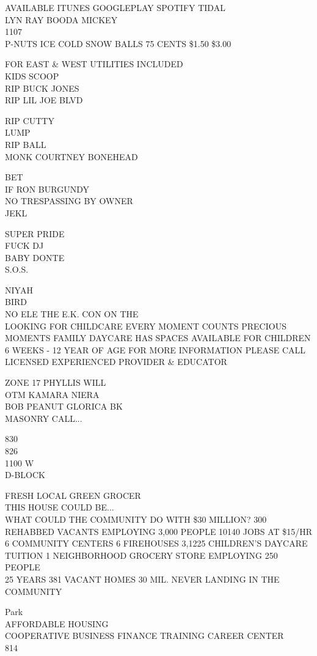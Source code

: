 \documentclass[10pt,letterpaper]{article}
\begin{document}
AVAILABLE ITUNES GOOGLEPLAY SPOTIFY TIDAL\\
LYN RAY BOODA MICKEY\\
1107\\
P{-}NUTS ICE COLD SNOW BALLS 75 CENTS \$1.50 \$3.00

FOR EAST \& WEST UTILITIES INCLUDED\\
KIDS SCOOP\\
RIP BUCK JONES\\
RIP LIL JOE BLVD

RIP CUTTY\\
LUMP\\
RIP BALL\\
MONK COURTNEY BONEHEAD

BET\\
IF RON BURGUNDY\\
NO TRESPASSING BY OWNER\\
JEKL

SUPER PRIDE\\
FUCK DJ\\
BABY DONTE\\
S.O.S.

NIYAH\\
BIRD\\
NO ELE THE E.K. CON ON THE\\
LOOKING FOR CHILDCARE EVERY MOMENT COUNTS PRECIOUS MOMENTS FAMILY DAYCARE HAS SPACES AVAILABLE FOR CHILDREN 6 WEEKS {-} 12 YEAR OF AGE FOR MORE INFORMATION PLEASE CALL LICENSED EXPERIENCED PROVIDER \& EDUCATOR

ZONE 17 PHYLLIS WILL\\
OTM KAMARA NIERA\\
BOB PEANUT GLORICA BK\\
MASONRY CALL...

830\\
826\\
1100 W\\
D{-}BLOCK

FRESH LOCAL GREEN GROCER\\
THIS HOUSE COULD BE...\\
WHAT COULD THE COMMUNITY DO WITH \$30 MILLION?  300 REHABBED VACANTS EMPLOYING 3,000 PEOPLE 10140 JOBS AT \$15/HR 6 COMMUNITY CENTERS 6 FIREHOUSES 3,1225 CHILDREN'S DAYCARE TUITION 1 NEIGHBORHOOD GROCERY STORE EMPLOYING 250 PEOPLE\\
25 YEARS 381 VACANT HOMES 30 MIL. NEVER LANDING IN THE COMMUNITY

Park\\
AFFORDABLE HOUSING\\
COOPERATIVE BUSINESS FINANCE TRAINING CAREER CENTER\\
814
\end{document}
